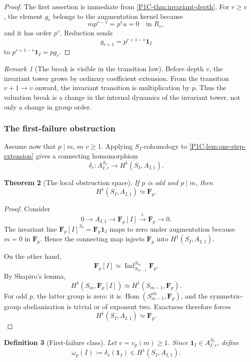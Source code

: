 \documentclass[11pt]{article}
\newtheorem{theorem}{Theorem}[section]
\newtheorem{definition}[theorem]{Definition}
\theoremstyle{remark}
\newtheorem{remark}[theorem]{Remark}
\newcommand{\F}{\mathbf F}
\providecommand{\Hom}{\operatorname{Hom}}
\begin{document}
\begin{proof}
The first assertion is immediate from \cref{P1C-thm:invariant-depth}.  For \(r\ge v\), the element \(g_r\) belongs to the augmentation kernel because
\[
 m p^{r-v}=p^r u=0\quad\text{in }R_r,
\]
and it has order \(p^v\).  Reduction sends
\[
 g_{r+1}=p^{r+1-v}\mathbf1_I
\]
to \(p^{r+1-v}\mathbf1_I=p g_r\).
\end{proof}

\begin{remark}[The break is visible in the transition law]
Before depth \(v\), the invariant tower grows by ordinary coefficient extension.  From the transition \(v+1\to v\) onward, the invariant transition is multiplication by \(p\).  Thus the valuation break is a change in the internal dynamics of the invariant tower, not only a change in group order.
\end{remark}

\subsubsection{The first-failure obstruction}

Assume now that \(p\mid m\), so \(v\ge1\).  Applying \(S_I\)-cohomology to \cref{P1C-lem:one-step-extension} gives a connecting homomorphism
\[
 \delta_r:A_{I,r}^{S_I}\longrightarrow H^1(S_I,A_{I,1}).
\]

\begin{theorem}[The local obstruction space]\label{P1C-thm:h1-one-dimensional}
If \(p\) is odd and \(p\mid m\), then
\[
 \boxed{H^1(S_I,A_{I,1})\simeq\F_p.}
\]
\end{theorem}

\begin{proof}
Consider
\[
 0\longrightarrow A_{I,1}
 \longrightarrow \F_p[I]
 \xrightarrow{\epsilon}\F_p
 \longrightarrow0.
\]
The invariant line \(\F_p[I]^{S_I}=\F_p\mathbf1_I\) maps to zero under augmentation because \(m=0\) in \(\F_p\).  Hence the connecting map injects \(\F_p\) into \(H^1(S_I,A_{I,1})\).

On the other hand,
\[
 \F_p[I]\simeq\operatorname{Ind}_{S_{m-1}}^{S_m}\F_p.
\]
By Shapiro's lemma,
\[
 H^1(S_m,\F_p[I])\simeq H^1(S_{m-1},\F_p).
\]
For odd \(p\), the latter group is zero: it is \(\Hom(S_{m-1}^{\mathrm{ab}},\F_p)\), and the symmetric-group abelianization is trivial or of exponent two.  Exactness therefore forces
\[
 H^1(S_I,A_{I,1})\simeq\F_p.
\]
\end{proof}

\begin{definition}[First-failure class]\label{P1C-def:first-failure}
Let \(v=v_p(m)\ge1\).  Since \(\mathbf1_I\in A_{I,v}^{S_I}\), define
\[
 \boxed{
 \omega_p(I):=\delta_v(\mathbf1_I)
 \in H^1(S_I,A_{I,1}).}
\]
\end{definition}
\end{document}
